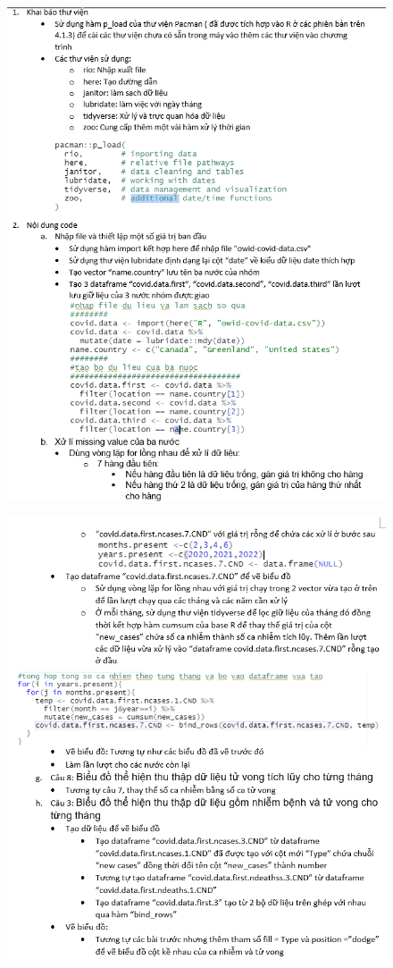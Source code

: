 \documentclass[a4paper]{article}
\theoremstyle{definition}
\begin{document}
\begin{enumerate}[i)]
		\begin{figure}[H]
		    \centering
			\includegraphics{images/6.0.png}
		\end{figure}
		\begin{figure}[H]
		    \centering
			\includegraphics{images/6.0.1.png}

\end{figure}
\end{enumerate}
\end{document}
